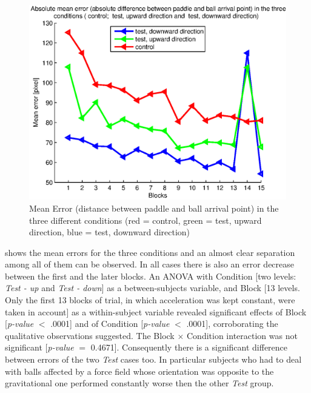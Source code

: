 \begin{figure}[tb]
	\centering
		\includegraphics [width=15cm] {fig/TTC.eps}
	\caption{Mean Error (distance between paddle and ball arrival point) in the three different conditions (red = control, green = test, upward direction, blue = test, downward direction)}
	\label{figTTC}
\end{figure}



shows the mean errors for the three conditions and an almost clear separation among all of them can be observed. In all cases there is also an error decrease between the first and the later blocks.
An ANOVA with Condition [two levels: \textit{Test - up} and \textit{Test - down}] as a between-subjects variable, and Block [13 levels. Only the first 13 blocks of trial, in which acceleration was kept constant, were taken in account] as a within-subject variable revealed significant effects of Block [\textit{p-value} $<$ .0001] and of Condition [\textit{p-value} $<$ .0001], corroborating the qualitative observations suggested. The Block $\times$ Condition interaction was not significant [\textit{p-value} $=$ 0.4671].  Consequently there is a significant difference between errors of the two \textit{Test} cases too. In particular subjects who had to deal with  balls affected by a force field whose orientation was opposite to the gravitational one performed constantly worse then the other \textit{Test} group.

